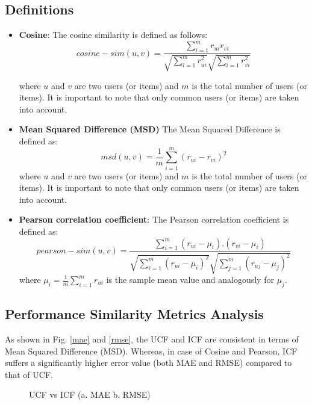 \documentclass[journal,onecolumn]{IEEEtran}
\begin{document}
\subsection{Definitions}
\begin{itemize}
\item \textbf{Cosine}: The cosine similarity is defined as follows:
\begin{equation}
cosine-sim(u, v) = \frac{\sum_{i =1}^{m} r_{ui} r_{vi}}{\sqrt{\sum_{i =1}^{m} r_{ui}^2} \sqrt{\sum_{i =1}^{m} r_{vi}^2}}
\end{equation}

where $u$ and $v$ are two users (or items) and $m$ is the total number of users (or items). It is important to note that only common users (or items) are taken into account.

\item \textbf{Mean Squared Difference (MSD)} The Mean Squared Difference is defined as:
\begin{equation}
msd(u, v) = \frac{1}{m} \sum_{i=1}^m (r_{ui} - r_{vi})^2
\end{equation}
where $u$ and $v$ are two users (or items) and $m$ is the total number of users (or items). It is important to note that only common users (or items) are taken into account.

\item \textbf{Pearson correlation coefficient}: The Pearson correlation coefficient is defined as:
\begin{equation}
pearson-sim(u,v) = \frac{\sum_{i=1}^m (r_{ui} - \mu_i).(r_{vi} - \mu_{i})}{\sqrt{\sum_{i=1}^m (r_{ui} - \mu_{i})^2} \sqrt{\sum_{j=1}^m (r_{uj} - \mu_{j})^2}}
\end{equation}
where $\mu_{i} = \frac{1}{m} \sum_{i=1}^{m} r_{ui}$ is the sample mean value and analogously for $\mu_{j}$.
\end{itemize}

\subsection{Performance Similarity Metrics Analysis}
As shown in Fig. \ref{mae} and \ref{rmse}, the UCF and ICF are consistent in terms of Mean Squared Difference (MSD). Whereas, in case of Cosine and Pearson, ICF suffers a significantly higher error value (both MAE and RMSE) compared to that of UCF.

\begin{figure}[H]
\begin{center}
\label{thr}

\caption{UCF vs ICF (a. MAE b. RMSE) }
\end{center}
\end{figure}
\end{document}
